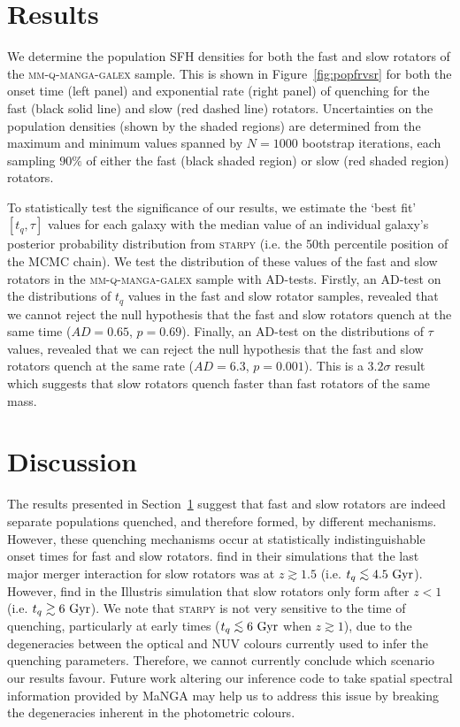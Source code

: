 \documentclass[useAMS,usenatbib]{mn2e}
\def\lesssim{\mathrel{\hbox{\rlap{\hbox{\lower3pt\hbox{$\sim$}}}\hbox{\raise2pt\hbox{$<$}}}}}
\begin{document}
\section{Results}\label{sec:results}

We determine the population SFH densities for both the fast and slow rotators of the \textsc{mm-q-manga-galex} sample. This is shown in Figure~\ref{fig:popfrvsr} for both the onset time (left panel) and exponential rate (right panel) of quenching for the fast (black solid line) and slow (red dashed line) rotators. Uncertainties on the population densities (shown by the shaded regions) are determined from the maximum and minimum values spanned by $N = 1000$ bootstrap iterations, each sampling $90\%$ of either the fast (black shaded region) or slow (red shaded region) rotators. 

To statistically test the significance of our results, we estimate the `best fit' $[t_q, \tau]$ values for each galaxy with the median value of an individual galaxy's posterior probability distribution from \textsc{starpy} (i.e. the 50th percentile position of the MCMC chain). We test the distribution of these values of the fast and slow rotators in the \textsc{mm-q-manga-galex} sample with AD-tests. Firstly, an AD-test on the distributions of $t_q$ values in the fast and slow rotator samples, revealed that we cannot reject the null hypothesis that the fast and slow rotators quench at the same time ($AD= 0.65$, $p = 0.69$). Finally, an AD-test on the distributions of $\tau$ values, revealed that we can reject the null hypothesis that the fast and slow rotators quench at the same rate ($AD= 6.3$, $p = 0.001$). This is a $3.2\sigma$ result which suggests that slow rotators quench faster than fast rotators of the same mass.


\section{Discussion}\label{sec:discussion}

The results presented in Section~\ref{sec:results} suggest that fast and slow rotators are indeed separate populations quenched, and therefore formed, by different mechanisms. However, these quenching mechanisms occur at statistically indistinguishable onset times for fast and slow rotators. \cite{khochfar11} find in their simulations that the last major merger interaction for slow rotators was at $z \gtrsim 1.5$ (i.e. $t_q \lesssim 4.5~\rm{Gyr}$). However, \cite{penoyre17}  find in the Illustris simulation that slow rotators only form after $z < 1$ (i.e. $t_q \gtrsim 6~\rm{Gyr}$). We note that \textsc{starpy} is not very sensitive to the time of quenching, particularly at early times ($t_q \lesssim 6~\rm{Gyr}$ when $z \gtrsim 1$), due to the degeneracies between the optical and NUV colours currently used to infer the quenching parameters. Therefore, we cannot currently conclude which scenario our results favour. Future work altering our inference code to take spatial spectral information provided by MaNGA may help us to address this issue by breaking the degeneracies inherent in the photometric colours.
\end{document}
